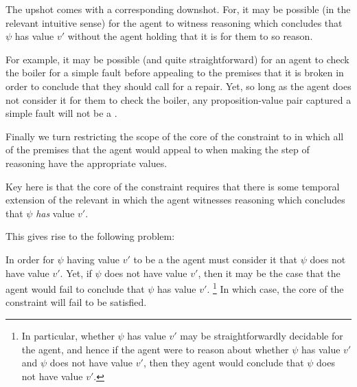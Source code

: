\begin{note}
  The upshot comes with a corresponding downshot.
  For, it may be possible (in the relevant intuitive sense) for the agent to witness reasoning which concludes that \(\psi\) has value \(v'\) without the agent holding that it is \epVAd{} for them to so reason.

  For example, it may be possible (and quite straightforward) for an agent to check the boiler for a simple fault before appealing to the premises that it is broken in order to conclude that they should call for a repair.
  Yet, so long as the agent does not consider it \epVAd{} for them to check the boiler, any proposition-value pair captured a simple fault will not be a \prequ{}.
\end{note}


\begin{note}
  Finally we turn restricting the scope of the core of the constraint to  in which all of the premises that the agent would appeal to when making the step of reasoning have the appropriate values.

  Key here is that the core of the constraint requires that there is some temporal extension of the relevant  in which the agent witnesses reasoning which concludes that \(\psi\) \emph{has} value \(v'\).

  This gives rise to the following problem:
\end{note}

\begin{note}[Problem]
  In order for \(\psi\) having value \(v'\) to be a \crequ{} the agent must consider it \epVAd{} that \(\psi\) does not have value \(v'\).
  Yet, if \(\psi\) does not have value \(v'\), then it may be the case that the agent would fail to conclude that \(\psi\) has value \(v'\).\nolinebreak
  \footnote{
    In particular, whether \(\psi\) has value \(v'\) may be straightforwardly decidable for the agent, and hence if the agent were to reason about whether \(\psi\) has value \(v'\) and \(\psi\) does not have value \(v'\), then they agent would conclude that \(\psi\) does not have value \(v'\).
  }
  In which case, the core of the constraint will fail to be satisfied.
\end{note}

